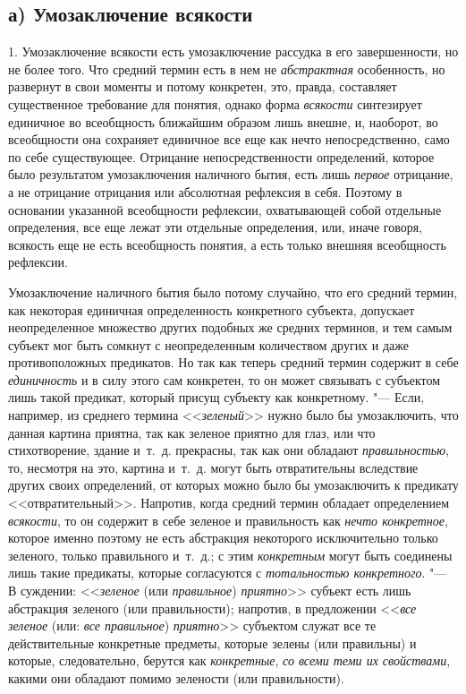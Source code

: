 {{\subsection[а) Умозаключение всякости]{а) Умозаключение всякости}
1. Умозаключение всякости есть умозаключение рассудка в его
завершенности, но не более того. Что средний термин есть в нем не
{\em абстрактная}
особенность, но развернут в свои моменты и потому конкретен,
это, правда, составляет существенное требование для понятия, однако форма
{\em всякости}
синтезирует единичное во всеобщность ближайшим образом лишь
внешне, и, наоборот, во всеобщности она сохраняет единичное все еще как
нечто непосредственно, само по себе существующее. Отрицание
непосредственности определений, которое было результатом умозаключения
наличного бытия, есть лишь {\em первое}
отрицание, а не отрицание отрицания или абсолютная рефлексия
в себя. Поэтому в основании указанной всеобщности рефлексии, охватывающей
собой отдельные определения, все еще лежат эти отдельные определения, или,
иначе говоря, всякость еще не есть всеобщность понятия, а есть только
внешняя всеобщность рефлексии.

Умозаключение наличного бытия было потому случайно, что его
средний термин, как некоторая единичная определенность конкретного
субъекта, допускает неопределенное множество других подобных же средних
терминов, и тем самым субъект мог быть сомкнут с неопределенным количеством
других и даже противоположных предикатов. Но так как теперь средний термин
содержит в себе {\em единичность}
и в силу этого сам конкретен, то он может связывать с
субъектом лишь такой предикат, который присущ субъекту как конкретному. "---
Если, например, из среднего термина
<<{\em зеленый}>> нужно
было бы умозаключить, что данная картина приятна, так как зеленое приятно
для глаз, или что стихотворение, здание и~т.~д. прекрасны, так как они
обладают {\em правильностью},
то, несмотря на это, картина и~т.~д. могут быть отвратительны
вследствие других своих определений, от которых можно было бы умозаключить
к предикату <<отвратительный>>. Напротив, когда средний термин обладает
определением {\em всякости},
то он содержит в себе зеленое и правильность как
{\em нечто конкретное},
которое именно поэтому не есть абстракция некоторого
исключительно только зеленого, только правильного и~т.~д.; с этим
{\em конкретным} могут
быть соединены лишь такие предикаты, которые согласуются с
{\em тотальностью конкретного}. "---
В суждении:
<<{\em зеленое} (или
{\em правильное})
{\em приятно}>> субъект
есть лишь абстракция зеленого (или правильности); напротив, в предложении
<<{\em все зеленое} (или:
{\em все правильное})
{\em приятно}>> субъектом
служат все те действительные конкретные предметы, которые зелены (или
правильны) и которые, следовательно, берутся как
{\em конкретные},
{\em со всеми теми их свойствами},
какими они обладают помимо зелености (или правильности).

}}
